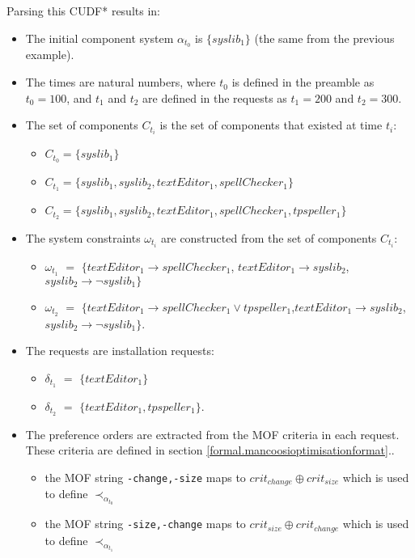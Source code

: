 Parsing this CUDF* results in:
\begin{itemize}
  \item The initial component system $\alpha_{t_0}$ is $\{syslib_1\}$ (the same from the previous example).
  \item The times are natural numbers, where $t_0$ is defined in the preamble as $t_0 = 100$, and $t_1$ and $t_2$ are defined in the requests as $t_1 = 200$ and $t_2 = 300$.
  \item The set of components $C_{t_i}$ is the set of components that existed at time $t_i$:
\begin{itemize}
  \item $C_{t_0} = \{syslib_1\}$
  \item $C_{t_1} = \{syslib_1, syslib_2, textEditor_1, spellChecker_1\}$
  \item $C_{t_2} = \{syslib_1, syslib_2, textEditor_1, spellChecker_1, tpspeller_1\}$
\end{itemize} 

\item The system constraints $\omega_{t_i}$ are constructed from the set of components $C_{t_i}$:
\begin{itemize}
  \item $\omega_{t_1}$ $=$ $\{ textEditor_1 \rightarrow spellChecker_1$, $textEditor_1 \rightarrow syslib_2$,  $syslib_2 \rightarrow \neg syslib_1\}$
  \item $\omega_{t_2}$ $=$ $\{textEditor_1 \rightarrow spellChecker_1 \vee tpspeller_1$,$textEditor_1 \rightarrow syslib_2$, $syslib_2 \rightarrow \neg syslib_1\}$.
\end{itemize}

\item The requests are installation requests:
\begin{itemize}
  \item $\delta_{t_1}$ $=$  $\{textEditor_1\}$
  \item $\delta_{t_2}$ $=$ $\{textEditor_1, tpspeller_1\}$.
\end{itemize}
\item The preference orders are extracted from the MOF criteria in each request.
These criteria are defined in section \ref{formal.mancoosioptimisationformat}..  
\begin{itemize}
  \item the MOF string \texttt{-change,-size} maps to  $crit_{change} \oplus crit_{size}$ which is used to define $\prec_{\alpha_{t_0}}$
  \item the MOF string \texttt{-size,-change} maps to  $crit_{size} \oplus crit_{change}$ which is used to define $\prec_{\alpha_{t_1}}$
\end{itemize}
\end{itemize}

